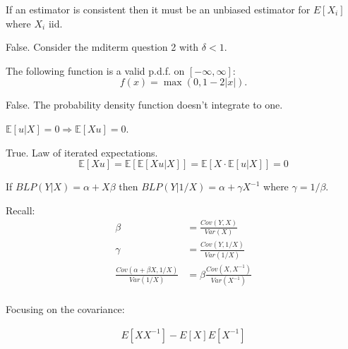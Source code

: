 \documentclass{exam}
\begin{document}
\begin{questions}
    \question If an estimator is consistent then it must be an unbiased estimator 
    for $E[X_i]$ where $X_i$ iid.


    \begin{solution}
    False. Consider the mditerm question 2 with $\delta < 1$.        



    \end{solution}


	\question The following function is a valid p.d.f. on $[-\infty, \infty]$:
		\[    f(x) = \max(0, 1 - 2 |x| ). \]

		\begin{solution}
		    False. The probability density function doesn't integrate to one.
		\end{solution}



    \question
    $\mathbb{E}[u|X] {=} 0 \Rightarrow \mathbb{E}[Xu] {=} 0$.
    \begin{solution}
    True. Law of iterated expectations. $$\mathbb{E}[X u] = \mathbb{E}[\mathbb{E}[X u|X]] = \mathbb{E}[X \cdot \mathbb{E}[u|X]] = 0$$
    \end{solution}

    \question If $BLP(Y | X) = \alpha + X \beta$ then $BLP(Y | 1/X) = \alpha +  \gamma X^{-1}$ where 
    $\gamma = 1/\beta$.

    Recall:
    \begin{align*}
        \beta &= \frac{Cov(Y, X)}{Var(X)} \\
        \gamma &= \frac{Cov(Y, 1/X)}{Var(1/X)} \\
        \frac{Cov(\alpha + \beta X, 1/X)}{Var(1/X)} &= \beta \frac{Cov(X, X^{-1})}{Var(X^{-1})} \\
    \end{align*}


    Focusing on the covariance:

    \begin{align*}
        E[XX^{-1}] - E[X]E[X^{-1}]
    \end{align*}

\end{questions}
\end{document}
